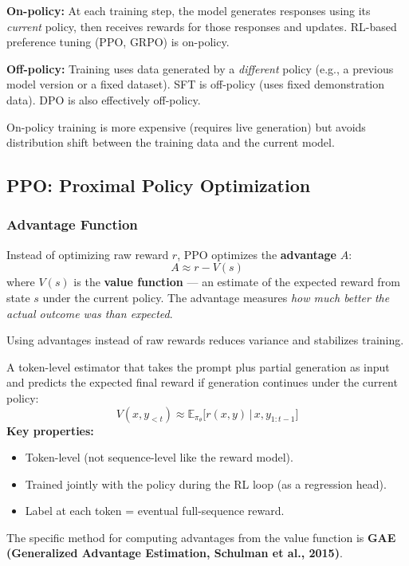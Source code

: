 \documentclass[11pt, a4paper]{article}
\begin{document}
\begin{defbox}
\textbf{On-policy:} At each training step, the model generates responses using its \emph{current} policy, then receives rewards for those responses and updates. RL-based preference tuning (PPO, GRPO) is on-policy.

\textbf{Off-policy:} Training uses data generated by a \emph{different} policy (e.g., a previous model version or a fixed dataset). SFT is off-policy (uses fixed demonstration data). DPO is also effectively off-policy.

On-policy training is more expensive (requires live generation) but avoids distribution shift between the training data and the current model.
\end{defbox}

\subsection{PPO: Proximal Policy Optimization}

\subsubsection{Advantage Function}

\begin{defbox}
Instead of optimizing raw reward $r$, PPO optimizes the \textbf{advantage} $A$:
\[
A \approx r - V(s)
\]
where $V(s)$ is the \textbf{value function} --- an estimate of the expected reward from state $s$ under the current policy. The advantage measures \emph{how much better the actual outcome was than expected}.

Using advantages instead of raw rewards reduces variance and stabilizes training.
\end{defbox}

\begin{defbox}
A token-level estimator that takes the prompt plus partial generation as input and predicts the expected final reward if generation continues under the current policy:
\[
V(x, y_{<t}) \approx \mathbb{E}_{\pi_\theta}\!\Big[r(x, y) \,\Big|\, x, y_{1:t-1}\Big]
\]
\textbf{Key properties:}
\begin{itemize}[leftmargin=1.5em]
  \item Token-level (not sequence-level like the reward model).
  \item Trained jointly with the policy during the RL loop (as a regression head).
  \item Label at each token = eventual full-sequence reward.
\end{itemize}
The specific method for computing advantages from the value function is \textbf{GAE (Generalized Advantage Estimation, Schulman et al., 2015)}.
\end{defbox}
\end{document}
